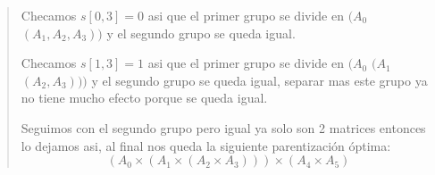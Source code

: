\begin{quote}
    Checamos $s[0,3]=0$ asi que el primer grupo se divide en $(A_0$ $(A_1, A_2,A_3))$ y el segundo grupo se queda igual. \vspace{.2cm}  

    Checamos $s[1,3]=1$ asi que el primer grupo se divide en $(A_0$ $(A_1$ $(A_2,A_3)))$ y el segundo grupo se queda igual, separar mas este grupo ya no tiene mucho efecto porque se queda igual. \vspace{.2cm}

    Seguimos con el segundo grupo pero igual ya solo son 2 matrices entonces lo dejamos asi, al final nos queda la siguiente parentización óptima: $$(A_0 \times (A_1 \times (A_2 \times A_3))) \times (A_4 \times A_5)$$ \vspace{.2cm}
\end{quote}
